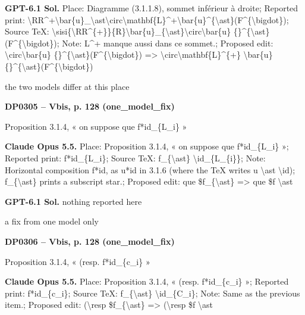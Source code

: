 \textbf{GPT-6.1 Sol.} Place: Diagramme (3.1.1.8), sommet inférieur à droite; Reported print: \textbackslash{}RR\textasciicircum{}+\textbackslash{}bar\{u\}\_\textbackslash{}ast\textbackslash{}circ\textbackslash{}mathbf\{L\}\textasciicircum{}+\textbackslash{}bar\{u\}\textasciicircum{}\{\textbackslash{}ast\}(F\textasciicircum{}\{\textbackslash{}bigdot\}); Source TeX: \textbackslash{}sisi\{\textbackslash{}RR\textasciicircum{}\{+\}\}\{R\}\textbackslash{}bar\{u\}\_\{\textbackslash{}ast\}\textbackslash{}circ\textbackslash{}bar\{u\} \{\}\textasciicircum{}\{\textbackslash{}ast\}(F\textasciicircum{}\{\textbackslash{}bigdot\}); Note: L\textasciicircum{}+ manque aussi dans ce sommet.; Proposed edit: \textbackslash{}circ\textbackslash{}bar\{u\} \{\}\textasciicircum{}\{\textbackslash{}ast\}(F\textasciicircum{}\{\textbackslash{}bigdot\}) =\allowbreak > \textbackslash{}circ\textbackslash{}mathbf\{L\}\textasciicircum{}\{+\} \textbackslash{}bar\{u\} \{\}\textasciicircum{}\{\textbackslash{}ast\}(F\textasciicircum{}\{\textbackslash{}bigdot\})\par
the two models differ at this place\par
\par\noindent\hypertarget{DP0305}{}\textbf{DP0305 -- Vbis, p. 128 (one\_model\_fix)}\par
Proposition 3.1.4, « on suppose que f*id\_\{L\_i\} »\par
\textbf{Claude Opus 5.5.} Place: Proposition 3.1.4, « on suppose que f*id\_\{L\_i\} »; Reported print: f*id\_\{L\_i\}; Source TeX: f\_\{\textbackslash{}ast\} \textbackslash{}id\_\{L\_\{i\}\}; Note: Horizontal composition f*id, as u*id in 3.1.6 (where the TeX writes u \textbackslash{}ast \textbackslash{}id); f\_\{\textbackslash{}ast\} prints a subscript star.; Proposed edit: que \$f\_\{\textbackslash{}ast\} =\allowbreak > que \$f \textbackslash{}ast\par
\textbf{GPT-6.1 Sol.} nothing reported here\par
a fix from one model only\par
\par\noindent\hypertarget{DP0306}{}\textbf{DP0306 -- Vbis, p. 128 (one\_model\_fix)}\par
Proposition 3.1.4, « (resp. f*id\_\{c\_i\} »\par
\textbf{Claude Opus 5.5.} Place: Proposition 3.1.4, « (resp. f*id\_\{c\_i\} »; Reported print: f*id\_\{c\_i\}; Source TeX: f\_\{\textbackslash{}ast\} \textbackslash{}id\_\{C\_i\}; Note: Same as the previous item.; Proposed edit: (\textbackslash{}resp \$f\_\{\textbackslash{}ast\} =\allowbreak > (\textbackslash{}resp \$f \textbackslash{}ast\par
